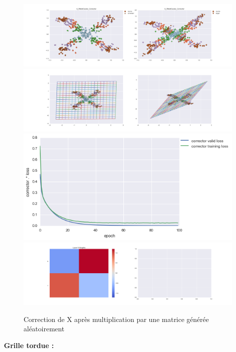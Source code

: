 \begin{figure}[H] %
\centering
\includegraphics[width=\linewidth]{fig/24-05-2016/X/X_RMatCluster_Corrector-DATA.png}
\includegraphics[width=\linewidth]{fig/24-05-2016/X/X_RMatCluster_Corrector-GridCheck.png}
\includegraphics[width=0.45\linewidth]{fig/24-05-2016/X/X_RMatCluster_Corrector-Learning_curve.png}
\includegraphics[width=\linewidth]{fig/24-05-2016/X/X_RMatCluster_Corrector-W.png}
\caption{Correction de X après multiplication par une matrice générée aléatoirement}
\label{fig:recap-X-RMat-cluster}
\end{figure}

{\Large \textbf{Grille tordue :}}

